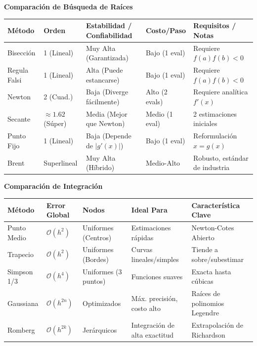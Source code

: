 \documentclass[10pt, landscape, twocolumn]{article}
\begin{document}
\renewcommand{\arraystretch}{1.1}
{\large
\centering

\textbf{\Large Comparación de Búsqueda de Raíces}
\vspace{0.3em}

\noindent 
\begin{tabularx}{0.95\linewidth}{l l X X l}
\toprule
\textbf{Método} & \textbf{Orden} & \textbf{Estabilidad / Confiabilidad} & \textbf{Costo/Paso} & \textbf{Requisitos / Notas} \\
\midrule
Bisección & 1 (Lineal)   & Muy Alta (Garantizada) & Bajo (1 eval) & Requiere $f(a)f(b) < 0$ \\
Regula Falsi & 1 (Lineal) & Alta (Puede estancarse) & Bajo (1 eval) & Requiere $f(a)f(b) < 0$ \\
Newton    & 2 (Cuad.)      & Baja (Diverge fácilmente)  & Alto (2 evals) & Requiere analítica $f'(x)$ \\
Secante   & $\approx 1.62$ (Súper) & Media (Mejor que Newton) & Medio (1 eval) & 2 estimaciones iniciales \\
Punto Fijo & 1 (Lineal) & Baja (Depende de $|g'(x)|$) & Bajo (1 eval) & Reformulación $x = g(x)$ \\
Brent     & Superlineal  & Muy Alta (Híbrido)   & Medio-Alto & Robusto, estándar de industria \\
\bottomrule
\end{tabularx}

\vspace{1em}
\textbf{\Large Comparación de Integración}
\vspace{0.3em}

\noindent
\begin{tabularx}{0.95\linewidth}{l l X X X}
\toprule
\textbf{Método} & \textbf{Error Global} & \textbf{Nodos} & \textbf{Ideal Para} & \textbf{Característica Clave} \\
\midrule
Punto Medio & $\mathcal{O}(h^2)$ & Uniformes (Centros) & Estimaciones rápidas & Newton-Cotes Abierto \\
Trapecio & $\mathcal{O}(h^2)$ & Uniformes (Bordes) & Curvas lineales/simples & Tiende a sobre/subestimar \\
Simpson 1/3 & $\mathcal{O}(h^4)$ & Uniformes (3 puntos) & Funciones suaves & Exacta hasta cúbicas \\
Gaussiana & $\mathcal{O}(h^{2n})$ & Optimizados & Máx. precisión, costo alto & Raíces de polinomios Legendre \\
Romberg & $\mathcal{O}(h^{2k})$ & Jerárquicos & Integración de alta exactitud & Extrapolación de Richardson \\
\bottomrule
\end{tabularx}

}
\end{document}
